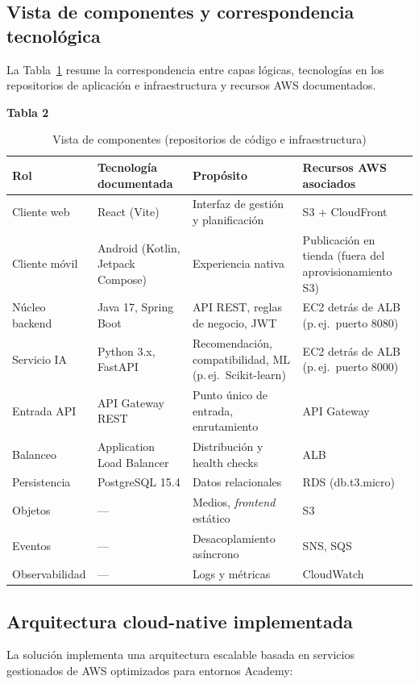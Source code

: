 \documentclass[12pt, letterpaper]{article}
\begin{document}
\subsection*{Vista de componentes y correspondencia tecnológica}

La Tabla~\ref{tab:componentes} resume la correspondencia entre capas lógicas, tecnologías en los repositorios de aplicación e infraestructura y recursos AWS documentados.

\begin{table}[h]
\centering
\textbf{Tabla 2}
\caption{Vista de componentes (repositorios de código e infraestructura)}
\label{tab:componentes}
\small
\begin{tabular}{p{2.6cm} p{3.2cm} p{4.2cm} p{3.8cm}}
\hline
Rol & Tecnología documentada & Propósito & Recursos AWS asociados \\
\hline
Cliente web & React (Vite) & Interfaz de gestión y planificación & S3 + CloudFront \\
Cliente móvil & Android (Kotlin, Jetpack Compose) & Experiencia nativa & Publicación en tienda (fuera del aprovisionamiento S3) \\
Núcleo backend & Java 17, Spring Boot & API REST, reglas de negocio, JWT & EC2 detrás de ALB (p.\,ej.\ puerto 8080) \\
Servicio IA & Python 3.x, FastAPI & Recomendación, compatibilidad, ML (p.\,ej.\ Scikit-learn) & EC2 detrás de ALB (p.\,ej.\ puerto 8000) \\
Entrada API & API Gateway REST & Punto único de entrada, enrutamiento & API Gateway \\
Balanceo & Application Load Balancer & Distribución y health checks & ALB \\
Persistencia & PostgreSQL 15.4 & Datos relacionales & RDS (db.t3.micro) \\
Objetos & --- & Medios, \textit{frontend} estático & S3 \\
Eventos & --- & Desacoplamiento asíncrono & SNS, SQS \\
Observabilidad & --- & Logs y métricas & CloudWatch \\
\hline
\end{tabular}
\end{table}

\subsection*{Arquitectura cloud-native implementada}

La solución implementa una arquitectura escalable basada en servicios gestionados de AWS optimizados para entornos Academy:
\end{document}
